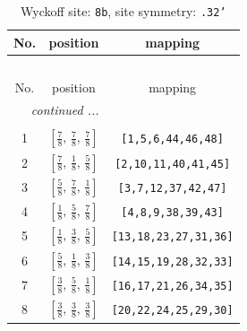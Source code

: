 \documentclass[fleqn,8pt]{jsarticle}
\begin{document}
\begin{longtable}{ccc}
\caption{Wyckoff site: {\tt 8b}, site symmetry: {\tt .32'}}
 \\
 \hline \hline
No. & position & mapping \\ \hline \endfirsthead

\multicolumn{2}{l}{\tablename\ \thetable{}} \\
 \hline \hline
No. & position & mapping \\ \hline \endhead

 \hline \hline
\multicolumn{2}{r}{\footnotesize\it continued ...} \\ \endfoot

 \hline \hline
\multicolumn{2}{r}{} \\ \endlastfoot

1 & $\left[ \frac{7}{8},\, \frac{7}{8},\, \frac{7}{8} \right]$ & {\tt [1,5,6,44,46,48]} \\ \hline
2 & $\left[ \frac{7}{8},\, \frac{1}{8},\, \frac{5}{8} \right]$ & {\tt [2,10,11,40,41,45]} \\ \hline
3 & $\left[ \frac{5}{8},\, \frac{7}{8},\, \frac{1}{8} \right]$ & {\tt [3,7,12,37,42,47]} \\ \hline
4 & $\left[ \frac{1}{8},\, \frac{5}{8},\, \frac{7}{8} \right]$ & {\tt [4,8,9,38,39,43]} \\ \hline
5 & $\left[ \frac{1}{8},\, \frac{3}{8},\, \frac{5}{8} \right]$ & {\tt [13,18,23,27,31,36]} \\ \hline
6 & $\left[ \frac{5}{8},\, \frac{1}{8},\, \frac{3}{8} \right]$ & {\tt [14,15,19,28,32,33]} \\ \hline
7 & $\left[ \frac{3}{8},\, \frac{5}{8},\, \frac{1}{8} \right]$ & {\tt [16,17,21,26,34,35]} \\ \hline
8 & $\left[ \frac{3}{8},\, \frac{3}{8},\, \frac{3}{8} \right]$ & {\tt [20,22,24,25,29,30]} \\
\end{longtable}
\renewcommand{\arraystretch}{1.2}
\end{document}
